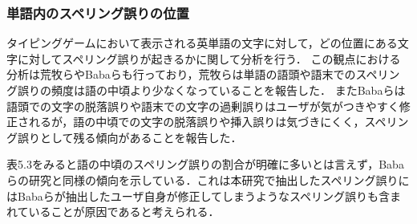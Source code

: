 \begin{comment}
表5.1においてのスペリング誤りの文字がbで入力すべき文字がvのときの頻度が9件，スペリング誤りの文字がvで入力すべき文字がbのときの頻度が12件であった．
\end{comment}

\subsubsection{単語内のスペリング誤りの位置}
タイピングゲームにおいて表示される英単語の文字に対して，どの位置にある文字に対してスペリング誤りが起きるかに関して分析を行う．
この観点における分析は荒牧ら\cite{aramakiNLP2010}やBabaら\cite{babaACL2012}も行っており，荒牧らは単語の語頭や語末でのスペリング誤りの頻度は語の中頃より少なくなっていることを報告した．
またBabaらは語頭での文字の脱落誤りや語末での文字の過剰誤りはユーザが気がつきやすく修正されるが，語の中頃での文字の脱落誤りや挿入誤りは気づきにくく，スペリング誤りとして残る傾向があることを報告した．

表5.3をみると語の中頃のスペリング誤りの割合が明確に多いとは言えず，Baba らの研究と同様の傾向を示している．これは本研究で抽出したスペリング誤りにはBabaらが抽出したユーザ自身が修正してしまうようなスペリング誤り\cite{babaACL2012}も含まれていることが原因であると考えられる．

\begin{comment}
表5.4には英単語の長さに応じた単語内のスペリング誤りの位置の割合を示している．表5.4から英単語の長さが長くなるに応じて語頭と語尾の文字に対するスペリング誤りの割合が減っていることがわかる．
\end{comment}

\begin{comment}
\subsubsection{スペリング誤りの割合}
表7にそれぞれの観点での分析におけるスペリング誤りの割合を示す．この結果からタイピングゲームのような通常より素早くタイピングを行ったり，文字を書き写すような状況ではキーボードのキー配置が近いことが原因で起きる打鍵誤りや入力すべき文字を飛ばしてしまう誤りが起きることがわかった．また単語の語頭や語末でのスペリング誤りの割合は表7に示す．
\end{comment}

\begin{comment}
\subsubsection{同じ文字が連続している文字列に対するスペリング誤り}
\end{comment}

